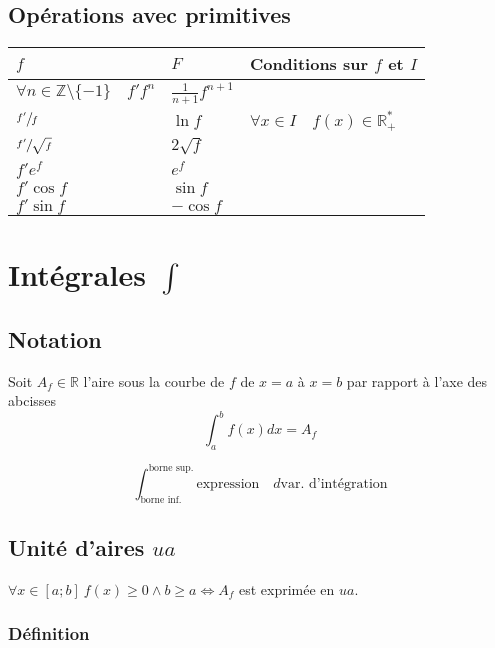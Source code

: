 \documentclass{article}
\newcommand{\R}{\mathds{R}}
\newcommand{\N}{\mathds{N}}
\newcommand{\Z}{\mathds{Z}}
\begin{document}
\subsection{Opérations avec primitives}
\begin{table}[h]
	\centering
	\label{tab:operations_avec_primitives}
	\begin{tabular}{lll}
		$f$ & $F$ & Conditions sur $f$ et $I$ \\\hline
		$\forall n\in \Z\setminus\{-1\} \quad f'f^{n}$ & $\frac{1}{n+1} f^{n+1}$ & \\
		$\sfrac{f'}{f}$ & $\ln f$ & $\forall x\in I\quad f(x)\in \R_+^\ast$ \\
		$\sfrac{f'}{\sqrt{f} }$ & $2\sqrt{f} $ & \\
		$f'e^{f}$ & $e^{f}$ & \\
		$f'\cos f$ & $  \sin f$ & \\
		$f'\sin f$ & $-\cos f$ & \\
	\end{tabular}
\end{table}

\newpage
\section{Intégrales $\int$}
\label{integrales}

\subsection{Notation}

Soit $A_f \in \R$ l'aire sous la courbe de $f$ de $x = a$ à $x = b$ par rapport à l'axe des abcisses
\[\int_a^b f(x) dx = A_f\]

\[\int_\text{borne inf.}^\text{borne sup.} \text{expression}\quad d\text{var. d'intégration}\]

\subsection{Unité d'aires $ua$}

$\forall x \in [a; b] \: f(x) \geq 0 \land b \geq a \iff A_f$ est exprimée en $ua$.

\subsubsection{Définition}
\end{document}
